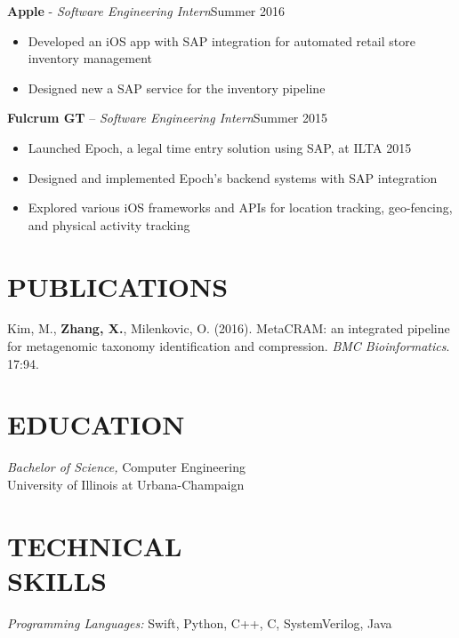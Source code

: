\documentclass[resmargin]{res}
\begin{document}
\begin{resume}
	{\bf Apple} - {\sl Software Engineering Intern}\hfill Summer 2016
	\begin{itemize}
		\vspace{1mm}
		\item Developed an iOS app with SAP integration for automated retail store inventory management
		\item Designed new a SAP service for the inventory pipeline
	\end{itemize}
	
	{\bf Fulcrum GT} -- {\sl Software Engineering Intern}\hfill Summer 2015
	\begin{itemize}
		\vspace{1mm}
		\item Launched Epoch, a legal time entry solution using SAP, at ILTA 2015
		\item Designed and implemented Epoch's backend systems with SAP integration
		\item Explored various iOS frameworks and APIs for location tracking, geo-fencing, and physical activity tracking
	\end{itemize}

\section{PUBLICATIONS}
	\textnormal{Kim, M., \textbf{Zhang, X.}, Milenkovic, O. (2016). MetaCRAM: an integrated pipeline for metagenomic taxonomy identification and compression. \textit{BMC Bioinformatics}. 17:94.}

\section{EDUCATION} {\sl Bachelor of Science,} Computer Engineering \\
                University of Illinois at Urbana-Champaign

\section{TECHNICAL \\ SKILLS} 
{\sl Programming Languages:} Swift, Python, C++, C, SystemVerilog, Java\\

\end{resume}
\end{document}
